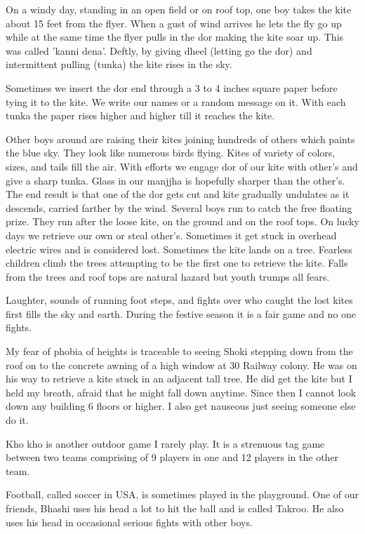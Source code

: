 On a windy day, standing in an open field or on roof top, one boy takes
the kite about 15 feet from the flyer. When a gust of wind arrives he lets
the fly go up while at the same time the flyer pulls in the dor making the
kite soar up. This was called 'kanni dena'. Deftly, by giving dheel
(letting go the dor) and intermittent pulling (tunka) the kite rises in
the sky. 

Sometimes we insert the dor end through a 3 to 4 inches square paper
before tying it to the kite. We write our names or a random message on it.
With each tunka the paper rises higher and higher till it reaches the
kite. 

 Other boys around are raising their kites joining hundreds of others
 which paints the blue sky. They look like numerous birds flying. Kites of
 variety of colors, sizes, and tails fill the air. With efforts we engage
 dor of our kite with other’s and give a sharp tunka. Glass in our manjjha
 is hopefully sharper than the other’s. The end result is that one of the
 dor gets cut and kite gradually undulates as it descends, carried farther
 by the wind. Several boys run to catch the free floating prize. They run
 after the loose kite, on the ground and on the roof tops. On lucky days
 we retrieve our own or steal other's. Sometimes it get stuck in overhead
 electric wires and is considered lost. Sometimes the kite lands on
 a tree. Fearless children climb the trees attempting to be the first one
 to retrieve the kite. Falls from the trees and roof tops are natural
 hazard but youth trumps all fears. 

Laughter, sounds of running foot steps, and fights over who caught the
lost kites first fills the sky and earth. During the festive season it is
a fair game and no one fights. 

My fear of phobia of heights is traceable to seeing Shoki stepping down
from the roof on to the concrete awning of a high window at 30 Railway
colony. He was on his way to retrieve a kite stuck in an adjacent tall
tree. He did get the kite but I held my breath, afraid that he might fall
down anytime. Since then I cannot look down any building 6 floors or
higher. I also get nauseous just seeing someone else do it. 

Kho kho is another outdoor game I rarely play. It is a strenuous tag game
between two teams comprising of 9 players in one and 12 players in the
other team. 

Football, called soccer in USA, is sometimes played in the playground. One
of our friends, Bhashi uses his head a lot to hit the ball and is called
Takroo. He also uses his head in occasional serious fights with other
boys. 

